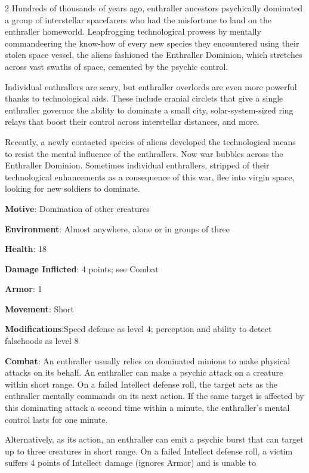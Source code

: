 \begin{multicols}{2}
Hundreds of thousands of years ago, enthraller ancestors psychically dominated a group of interstellar spacefarers who had the misfortune to land on the enthraller homeworld. Leapfrogging technological prowess by mentally commandeering the know-how of every new species they encountered using their stolen space vessel, the aliens fashioned the Enthraller Dominion, which stretches across vast swaths of space, cemented by the psychic control.

Individual enthrallers are scary, but enthraller overlords are even more powerful thanks to technological aids. These include cranial circlets that give a single enthraller governor the ability to dominate a small city, solar-system-sized ring relays that boost their control across interstellar distances, and more.

Recently, a newly contacted species of aliens developed the technological means to resist the mental influence of the enthrallers. Now war bubbles across the Enthraller Dominion. Sometimes individual enthrallers, stripped of their technological enhancements as a consequence of this war, flee into virgin space, looking for new soldiers to dominate. 

\textbf{Motive}: Domination of other creatures

\textbf{Environment}: Almost anywhere, alone or in groups of three

\textbf{Health}: 18

\textbf{Damage Inflicted}: 4 points; see Combat

\textbf{Armor}: 1

\textbf{Movement}: Short

\textbf{Modifications}:Speed defense as level 4; perception and ability to detect falsehoods as level 8

\textbf{Combat}: An enthraller usually relies on dominated minions to make physical attacks on its behalf. An enthraller can
make a psychic attack on a creature within short range. On a failed Intellect defense roll, the target acts as the enthraller mentally commands on its next action. If the same target is affected by this dominating attack a second time within a minute, the enthraller’s mental control lasts for one minute.

Alternatively, as its action, an enthraller can emit a psychic burst that can target up to three creatures in short range. On a failed Intellect defense roll, a victim suffers 4 points of Intellect damage (ignores Armor) and is unable to


\end{multicols}
